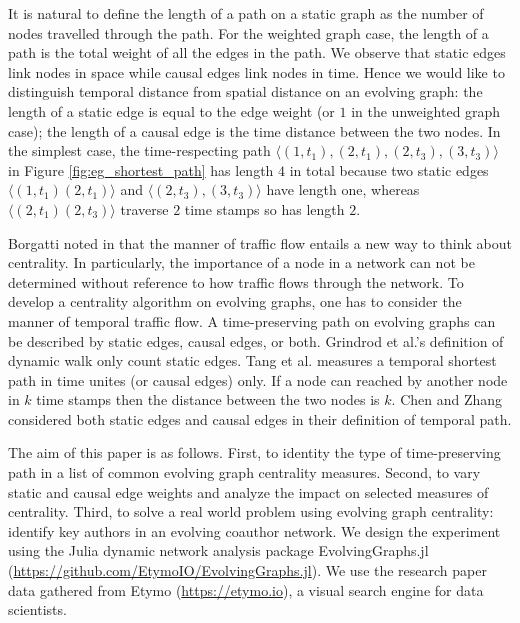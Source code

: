 \documentclass[12pt]{article}
\theoremstyle{definition}
\begin{document}
It is natural to define the length of a path on a static graph as the number of nodes travelled through the path. For the weighted graph case, the length of a path is the total weight of all the edges in the path. We observe that static edges link nodes in space while causal edges link nodes in time. Hence we would like to distinguish temporal distance from spatial distance on an evolving graph: the length of a static edge is equal to the edge weight (or $1$ in the unweighted graph case); the length of a causal edge is the time distance between the two nodes. In the simplest case, the time-respecting path
$\langle (1, t_1) ,(2, t_1) , (2, t_3), (3, t_3)\rangle$ in Figure \ref{fig:eg_shortest_path} has length $4$ in total because two static edges $\langle (1, t_1) (2, t_1) \rangle$ and $\langle (2, t_3), (3, t_3) \rangle$ have length one, whereas $\langle (2, t_1) (2, t_3) \rangle$ traverse $2$ time stamps so has length $2$.



Borgatti noted in \cite{borgatti05} that the manner of traffic flow entails a new way to think about centrality. In particularly, the importance of a node in a network can not be determined without reference to how traffic flows through the network.
To develop a centrality algorithm on evolving graphs, one has to consider the manner of temporal traffic flow.
A time-preserving path on evolving graphs can be described by static edges, causal edges, or both.
Grindrod et al.'s definition of dynamic walk \cite{grindrod11} only count static edges.
Tang et al. \cite{tang10s} measures a temporal shortest path in time unites (or causal edges) only. If a node can reached by another node in $k$ time stamps then the distance between the two nodes is $k$. Chen and Zhang \cite{chen16} considered both static edges and causal edges in their definition of temporal path.


The aim of this paper is as follows. First, to identity the type of time-preserving path in a list of common evolving graph centrality measures. Second, to vary static and causal edge weights and analyze the impact on selected measures of centrality.
Third, to solve a real world problem using evolving graph centrality: identify key authors in an evolving coauthor network.
We design the experiment using the Julia dynamic network analysis package
EvolvingGraphs.jl (\url{https://github.com/EtymoIO/EvolvingGraphs.jl}).
We use the research paper data gathered from Etymo (\url{https://etymo.io}), a visual search engine for data scientists.
\end{document}
